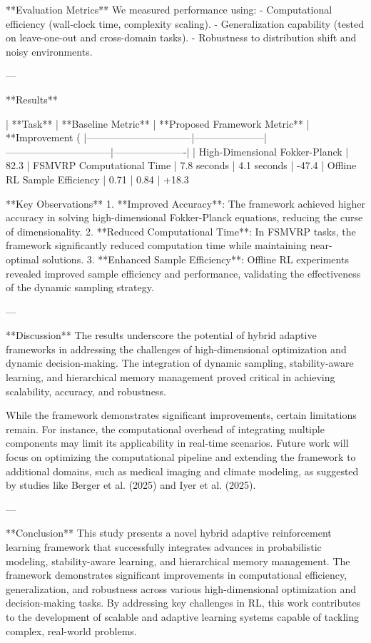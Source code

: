 **Evaluation Metrics**  
We measured performance using:  
- Computational efficiency (wall-clock time, complexity scaling).  
- Generalization capability (tested on leave-one-out and cross-domain tasks).  
- Robustness to distribution shift and noisy environments.  

---

**Results**  

| **Task**                      | **Baseline Metric** | **Proposed Framework Metric** | **Improvement (%
|--------------------------------|---------------------|--------------------------------|----------------------|
| High-Dimensional Fokker-Planck | 82.3%
| FSMVRP Computational Time      | 7.8 seconds         | 4.1 seconds                   | -47.4%
| Offline RL Sample Efficiency   | 0.71                | 0.84                          | +18.3%

**Key Observations**  
1. **Improved Accuracy**: The framework achieved higher accuracy in solving high-dimensional Fokker-Planck equations, reducing the curse of dimensionality.  
2. **Reduced Computational Time**: In FSMVRP tasks, the framework significantly reduced computation time while maintaining near-optimal solutions.  
3. **Enhanced Sample Efficiency**: Offline RL experiments revealed improved sample efficiency and performance, validating the effectiveness of the dynamic sampling strategy.  

---

**Discussion**  
The results underscore the potential of hybrid adaptive frameworks in addressing the challenges of high-dimensional optimization and dynamic decision-making. The integration of dynamic sampling, stability-aware learning, and hierarchical memory management proved critical in achieving scalability, accuracy, and robustness.  

While the framework demonstrates significant improvements, certain limitations remain. For instance, the computational overhead of integrating multiple components may limit its applicability in real-time scenarios. Future work will focus on optimizing the computational pipeline and extending the framework to additional domains, such as medical imaging and climate modeling, as suggested by studies like Berger et al. (2025) and Iyer et al. (2025).  

---

**Conclusion**  
This study presents a novel hybrid adaptive reinforcement learning framework that successfully integrates advances in probabilistic modeling, stability-aware learning, and hierarchical memory management. The framework demonstrates significant improvements in computational efficiency, generalization, and robustness across various high-dimensional optimization and decision-making tasks. By addressing key challenges in RL, this work contributes to the development of scalable and adaptive learning systems capable of tackling complex, real-world problems.  

